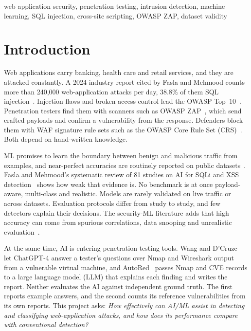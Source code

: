 \documentclass[conference]{IEEEtran}
\begin{document}
\begin{IEEEkeywords}
web application security, penetration testing, intrusion detection, machine learning, SQL injection,
cross-site scripting, OWASP ZAP, dataset validity
\end{IEEEkeywords}

\section{Introduction}
Web applications carry banking, health care and retail services, and they are attacked
constantly. A 2024 industry report cited by Fasla and Mehmood counts more than 240,000
web-application attacks per day, 38.8\% of them SQL injection~\cite{fasla2026}. Injection flaws
and broken access control lead the OWASP Top~10~\cite{owasptop10}. Penetration
testers find them with scanners such as OWASP ZAP~\cite{zap}, which send crafted payloads and
confirm a vulnerability from the response. Defenders block them with WAF signature rule sets
such as the OWASP Core Rule Set (CRS)~\cite{crs}. Both depend on hand-written knowledge.

ML promises to learn the boundary between benign and malicious traffic from examples, and
near-perfect accuracies are routinely reported on public datasets~\cite{tadhani2024,yang2025}.
Fasla and Mehmood's systematic review of 81 studies on AI for SQLi and XSS
detection~\cite{fasla2026} shows how weak that evidence is. No benchmark is at once payload-aware,
multi-class and realistic. Models are rarely validated on live traffic or across datasets.
Evaluation protocols differ from study to study, and few detectors explain their decisions. The
security-ML literature adds that high accuracy can come from spurious correlations, data snooping
and unrealistic evaluation~\cite{arp2022,sommer2010}.

At the same time, AI is entering penetration-testing tools. Wang and D'Cruze~\cite{wang2024} let
ChatGPT-4 answer a tester's questions over Nmap and Wireshark output from a vulnerable virtual
machine, and AutoRed~\cite{khairmode2026} passes Nmap and CVE records to a large language model
(LLM) that explains each finding and writes the report. Neither evaluates the AI against
independent ground truth. The first reports example answers, and the second counts its reference
vulnerabilities from its own reports.
This project asks:
\emph{How effectively can AI/ML assist in detecting and classifying web-application attacks, and how
does its performance compare with conventional detection?}
\end{document}
